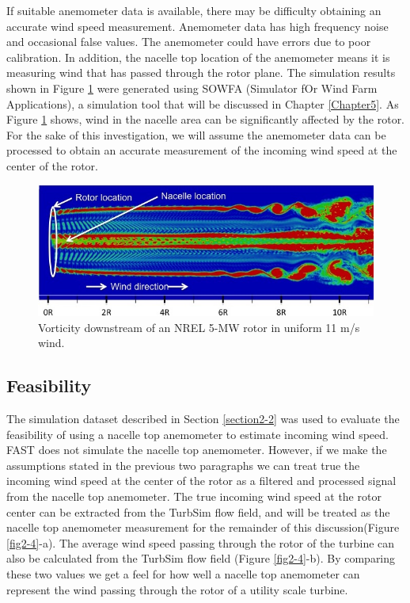 If suitable anemometer data is available, there may be difficulty obtaining an accurate wind speed measurement. Anemometer data  has high frequency noise and occasional false values. The anemometer could have errors due to poor calibration. In addition, the nacelle top location of the anemometer means it is measuring wind that has passed through the rotor plane. The simulation results shown in Figure \ref{fig2-3} were generated using SOWFA (Simulator fOr Wind Farm Applications), a simulation tool that will be discussed in Chapter \ref{Chapter5}. As Figure \ref{fig2-3} shows, wind in the nacelle area can be significantly affected by the rotor. For the sake of this investigation, we will assume the anemometer data can be processed to obtain an accurate measurement of the incoming wind speed at the center of the rotor.



\begin{figure}[htbp]
	\centering
		\includegraphics[width = \linewidth]{Figures/ch2Figures/fig2-3.jpg}
		
	\caption{Vorticity downstream of an NREL 5-MW rotor in uniform 11 m/s wind.}
	\label{fig2-3}
\end{figure}





\subsection{Feasibility}

The simulation dataset described in Section \ref{section2-2} was used to evaluate the feasibility of using a nacelle top anemometer to estimate incoming wind speed.  FAST does not simulate the nacelle top anemometer. However, if we make the assumptions stated in the previous two paragraphs we can treat true the incoming wind speed at the center of the rotor as a filtered and processed signal from the nacelle top anemometer. The true incoming wind speed at the rotor center can be extracted from the TurbSim flow field, and will be treated as the nacelle top anemometer measurement for the remainder of this discussion(Figure \ref{fig2-4}-a). The average wind speed passing through the rotor of the turbine can also be calculated from the TurbSim flow field (Figure  \ref{fig2-4}-b). By comparing these two values we get a feel for how well a nacelle top anemometer can represent the wind passing through the rotor of a utility scale turbine.

